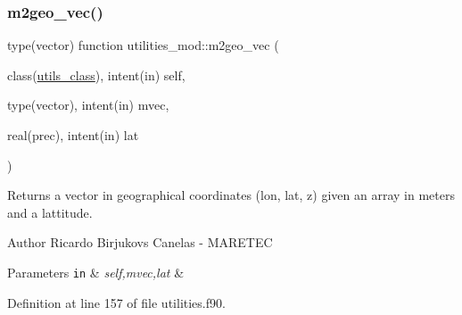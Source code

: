 \subsubsection{\texorpdfstring{m2geo\+\_\+vec()}{m2geo\_vec()}}
{\footnotesize\ttfamily type(vector) function utilities\+\_\+mod\+::m2geo\+\_\+vec (\begin{DoxyParamCaption}\item[{class(\mbox{\hyperlink{structutilities__mod_1_1utils__class}{utils\+\_\+class}}), intent(in)}]{self,  }\item[{type(vector), intent(in)}]{mvec,  }\item[{real(prec), intent(in)}]{lat }\end{DoxyParamCaption})\hspace{0.3cm}{\ttfamily [private]}}



Returns a vector in geographical coordinates (lon, lat, z) given an array in meters and a lattitude. 

\begin{DoxyAuthor}{Author}
Ricardo Birjukovs Canelas -\/ M\+A\+R\+E\+T\+EC 
\end{DoxyAuthor}

\begin{DoxyParams}[1]{Parameters}
\mbox{\tt in}  & {\em self,mvec,lat} & \\
\hline
\end{DoxyParams}


Definition at line 157 of file utilities.\+f90.



